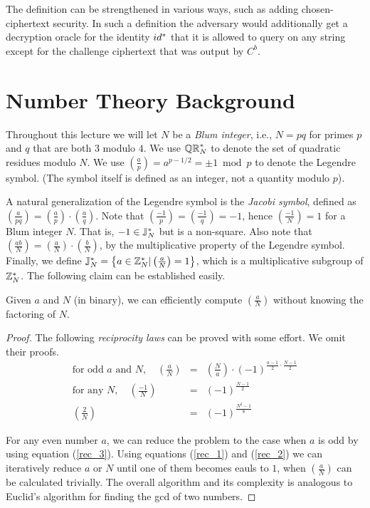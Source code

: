 \documentclass[11pt]{article}
\begin{document}
The definition can be strengthened in various ways, such as adding
chosen-ciphertext security.  In such a definition the adversary would
additionally get a decryption oracle for the identity $id^{*}$ that
it is allowed to query on any string except for the challenge
ciphertext that was output by $C^{b}$.

\section{Number Theory Background}
\label{sec:numb-theory-backgr}

Throughout this lecture we will let $N$ be a \textit{Blum integer},
i.e., $N = pq$ for primes $p$ and $q$ that are both $3$ modulo $4$.
We use $\mathbb{QR}_{N}^*$ to denote the set of quadratic residues modulo $N$.
We use $\left( \frac{a}{p} \right) = a^{p-1/2} = \pm 1 \bmod p$ to
denote the Legendre symbol.  (The symbol itself is defined as an
integer, not a quantity modulo $p$).

A natural generalization of the Legendre symbol is the \emph{Jacobi
  symbol}, defined as $\left( \frac{a}{pq}\right) = \left(
  \frac{a}{p}\right)\cdot \left( \frac{a}{q}\right)$.  Note that
$\left( \frac{-1}{p}\right) = \left( \frac{-1}{q} \right) = -1$, hence
$\left( \frac{-1}{N}\right) = 1$ for a Blum integer $N$.  That is, $-1
\in \mathbb{J}_N^{*}$ but is a non-square.  Also note that $\left(
  \frac{ab}{N}\right) = \left( \frac{a}{N}\right) \cdot \left(
  \frac{b}{N}\right)$, by the multiplicative property of the Legendre
symbol.  Finally, we define $\mathbb{J}_N^{*} = \left\{ a \in \mathbb{Z}^*_N |
  \left(\frac{a}{N}\right) = 1 \right\}$, which is a multiplicative
subgroup of $\mathbb{Z}_N^{*}$.  The following claim can be established easily.

\begin{claim}
  \label{compute_claim}
  Given $a$ and $N$ (in binary), we can efficiently compute $\left(
    \frac{a}{N}\right)$ without knowing the factoring of $N$.
\end{claim}

\begin{proof}
  The following \emph{reciprocity laws} can be proved with some
  effort.  We omit their proofs.
  \begin{eqnarray}
    \label{rec_1} \text{for odd $a$ and $N$}, \quad \left(\frac{a}{N}
    \right) &=& \left(\frac{N}{a} \right) \cdot \left( -1
    \right)^{\frac{a-1}{2}\cdot\frac{N-1}{2}} \\
    \label{rec_2} \text{for any } N, \quad \left(\frac{-1}{N} \right) &=&
    \left( -1 \right)^{\frac{N-1}{2}} \\
    \label{rec_3}\left(\frac{2}{N} \right) &=& \left( -1
    \right)^{\frac{N^2-1}{8}}
  \end{eqnarray}

  For any even number $a$, we can reduce the problem to the case when
  $a$ is odd by using equation (\ref{rec_3}).  Using equations
  (\ref{rec_1}) and (\ref{rec_2}) we can iteratively reduce $a$ or $N$
  until one of them becomes eauls to $1$, when $\left(\frac{a}{N}
  \right)$ can be calculated trivially.  The overall algorithm and its
  complexity is analogous to Euclid's algorithm for finding the gcd of
  two numbers.
\end{proof}
\end{document}
